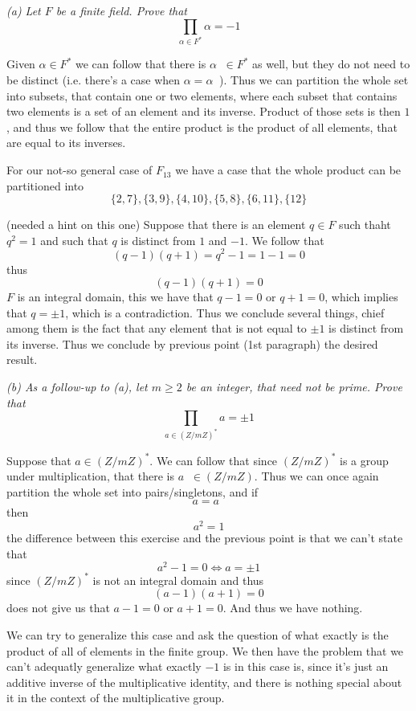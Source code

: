 \documentclass[11pt,oneside,titlepage]{book}
\DeclareMathOperator \inv {^{-1}}
\DeclareMathOperator \lra {\Leftrightarrow}
\newcommand{\set}[1]{\{ #1 \}}
\begin{document}
\textit{(a) Let $F$ be a finite field. Prove that
  $$\prod_{\alpha \in F^*}{\alpha} = -1$$
}

Given $\alpha \in F^*$ we can follow that there is $\alpha\inv \in
F^*$ as well, but they do not need to be distinct (i.e. there's a case
when $\alpha = \alpha\inv$). Thus we can partition the whole set into
subsets, that contain one or two elements, where each subset that
contains two elements is a set of an element and its inverse.
Product of those sets is then $1$, and thus we follow that
the entire product is the product of all elements, that are equal
to its inverses.

For our not-so general case of $F_{13}$ we have a case that
the whole product can be partitioned into
$$\set{2, 7}, \set{3, 9}, \set{4, 10}, \set{5, 8},
\set{6, 11}, \set{12}$$

(needed a hint on this one)
Suppose that there is an element $q \in F$ such thaht $q^2 = 1$ and
such that $q$ is distinct from $1$ and $-1$. We follow that
$$(q - 1) (q + 1) = q^2 - 1 = 1 - 1 = 0$$
thus
$$(q - 1)( q + 1) = 0$$
$F$ is an integral domain,
this we have that $q - 1 = 0$ or $q + 1 = 0$, which implies that $q =
\pm 1$, which is a contradiction. Thus we conclude several things,
chief among them is the fact that any element that is not equal
to $\pm 1$ is distinct from its inverse. Thus we conclude by previous
point (1st paragraph) the desired result.

\textit{(b) As a follow-up to (a), let $m \geq 2$ be an integer, that
  need not be prime. Prove that
  $$\prod_{a \in (Z/mZ)^*}a = \pm 1$$
}

Suppose that $a \in (Z/mZ)^*$. We can follow that since $(Z/mZ)^*$ is
a group under multiplication, that there is $a\inv \in (Z/mZ)$. Thus
we can once again partition the whole set into pairs/singletons, and
if
$$a = a\inv$$
then
$$a^2 = 1$$
the difference between this exercise and the previous point is that we
can't state that
$$a^2 - 1 = 0 \lra a = \pm 1$$
since $(Z/mZ)^*$ is not an integral domain and thus
$$(a - 1)(a + 1) = 0$$
does not give us that $a - 1 = 0$ or $a + 1 = 0$. And thus we have nothing.

We can try to generalize this case and ask the question of what
exactly is the product of all of elements in the finite group.  We
then have the problem that we can't adequatly generalize what exactly
$-1$ is in this case is, since it's just an additive inverse of the
multiplicative identity, and there is nothing special about it in the
context of the multiplicative group.
\end{document}
